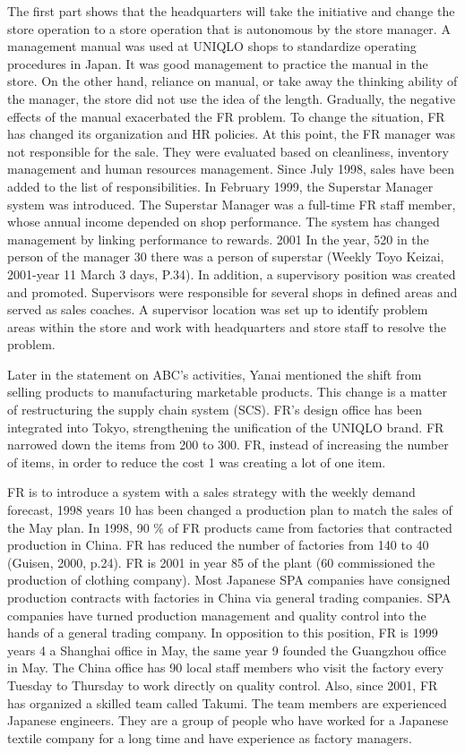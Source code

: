\documentclass[12pt,]{article}
\begin{document}
The first part shows that the headquarters will take the initiative and
change the store operation to a store operation that is autonomous by
the store manager. A management manual was used at UNIQLO shops to
standardize operating procedures in Japan. It was good management to
practice the manual in the store. On the other hand, reliance on manual,
or take away the thinking ability of the manager, the store did not use
the idea of the length. Gradually, the negative effects of the manual
exacerbated the FR problem. To change the situation, FR has changed its
organization and HR policies. At this point, the FR manager was not
responsible for the sale. They were evaluated based on cleanliness,
inventory management and human resources management. Since July 1998,
sales have been added to the list of responsibilities. In February 1999,
the Superstar Manager system was introduced. The Superstar Manager was a
full-time FR staff member, whose annual income depended on shop
performance. The system has changed management by linking performance to
rewards. 2001 In the year, 520 in the person of the manager 30 there was
a person of superstar (Weekly Toyo Keizai, 2001-year 11 March 3 days,
P.34). In addition, a supervisory position was created and promoted.
Supervisors were responsible for several shops in defined areas and
served as sales coaches. A supervisor location was set up to identify
problem areas within the store and work with headquarters and store
staff to resolve the problem.

Later in the statement on ABC's activities, Yanai mentioned the shift
from selling products to manufacturing marketable products. This change
is a matter of restructuring the supply chain system (SCS). FR's design
office has been integrated into Tokyo, strengthening the unification of
the UNIQLO brand. FR narrowed down the items from 200 to 300. FR,
instead of increasing the number of items, in order to reduce the cost 1
was creating a lot of one item.

FR is to introduce a system with a sales strategy with the weekly demand
forecast, 1998 years 10 has been changed a production plan to match the
sales of the May plan. In 1998, 90 \% of FR products came from factories
that contracted production in China. FR has reduced the number of
factories from 140 to 40 (Guisen, 2000, p.24). FR is 2001 in year 85 of
the plant (60 commissioned the production of clothing company). Most
Japanese SPA companies have consigned production contracts with
factories in China via general trading companies. SPA companies have
turned production management and quality control into the hands of a
general trading company. In opposition to this position, FR is 1999
years 4 a Shanghai office in May, the same year 9 founded the Guangzhou
office in May. The China office has 90 local staff members who visit the
factory every Tuesday to Thursday to work directly on quality control.
Also, since 2001, FR has organized a skilled team called Takumi. The
team members are experienced Japanese engineers. They are a group of
people who have worked for a Japanese textile company for a long time
and have experience as factory managers.
\end{document}
